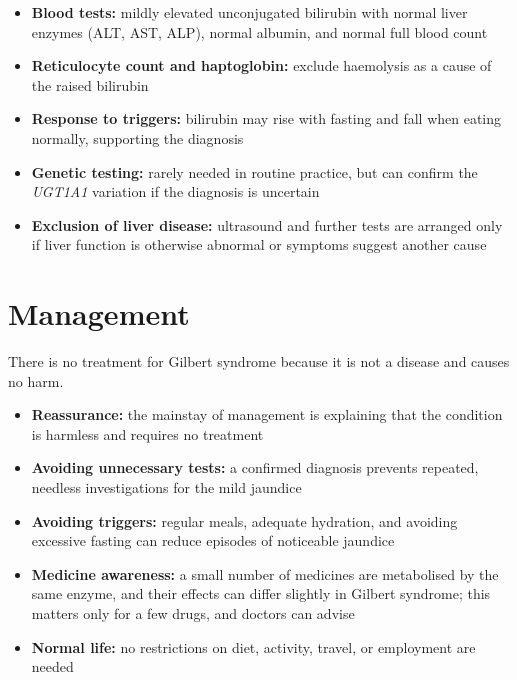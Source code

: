\begin{itemize}
    \item \textbf{Blood tests:} mildly elevated unconjugated bilirubin with normal liver enzymes (ALT, AST, ALP), normal albumin, and normal full blood count
    \item \textbf{Reticulocyte count and haptoglobin:} exclude haemolysis as a cause of the raised bilirubin
    \item \textbf{Response to triggers:} bilirubin may rise with fasting and fall when eating normally, supporting the diagnosis
    \item \textbf{Genetic testing:} rarely needed in routine practice, but can confirm the \textit{UGT1A1} variation if the diagnosis is uncertain
    \item \textbf{Exclusion of liver disease:} ultrasound and further tests are arranged only if liver function is otherwise abnormal or symptoms suggest another cause
\end{itemize}

\section*{Management}
There is no treatment for Gilbert syndrome because it is not a disease and causes no harm.

\begin{itemize}
    \item \textbf{Reassurance:} the mainstay of management is explaining that the condition is harmless and requires no treatment
    \item \textbf{Avoiding unnecessary tests:} a confirmed diagnosis prevents repeated, needless investigations for the mild jaundice
    \item \textbf{Avoiding triggers:} regular meals, adequate hydration, and avoiding excessive fasting can reduce episodes of noticeable jaundice
    \item \textbf{Medicine awareness:} a small number of medicines are metabolised by the same enzyme, and their effects can differ slightly in Gilbert syndrome; this matters only for a few drugs, and doctors can advise
    \item \textbf{Normal life:} no restrictions on diet, activity, travel, or employment are needed
\end{itemize}

